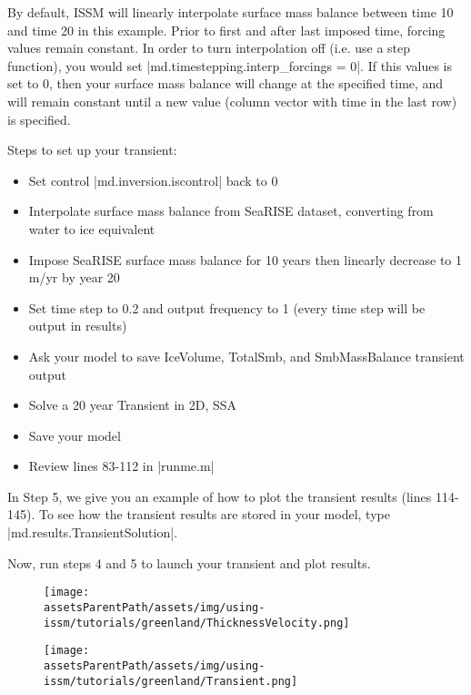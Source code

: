 By default, ISSM will linearly interpolate surface mass balance between time 10 and time 20 in this example. Prior to first and after last imposed time, forcing values remain constant. In order to turn interpolation off (i.e. use a step function), you would set \lstinlinebg|md.timestepping.interp_forcings = 0|. If this values is set to 0, then your surface mass balance will change at the specified time, and will remain constant until a new value (column vector with time in the last row) is specified.

Steps to set up your transient:
\begin{itemize}
	\item Set control \lstinlinebg|md.inversion.iscontrol| back to 0
	\item Interpolate surface mass balance from SeaRISE dataset, converting from water to ice equivalent
	\item Impose SeaRISE surface mass balance for 10 years then linearly decrease to 1 m/yr by year 20
	\item Set time step to 0.2 and output frequency to 1 (every time step will be output in results)
	\item Ask your model to save IceVolume, TotalSmb, and SmbMassBalance transient output
	\item Solve a 20 year Transient in 2D, SSA
	\item Save your model
	\item Review lines 83-112 in \lstinlinebg|runme.m|
\end{itemize}

In Step 5, we give you an example of how to plot the transient results (lines 114-145). To see how the transient results are stored in your model, type \lstinlinebg|md.results.TransientSolution|.

Now, run steps 4 and 5 to launch your transient and plot results.
\begin{figure}[H]
	\begin{center}
		\texttt{[image: \\assetsParentPath/assets/img/using-issm/tutorials/greenland/ThicknessVelocity.png]}
	\end{center}
\end{figure}

\begin{figure}[H]
	\begin{center}
		\texttt{[image: \\assetsParentPath/assets/img/using-issm/tutorials/greenland/Transient.png]}
	\end{center}
\end{figure}

